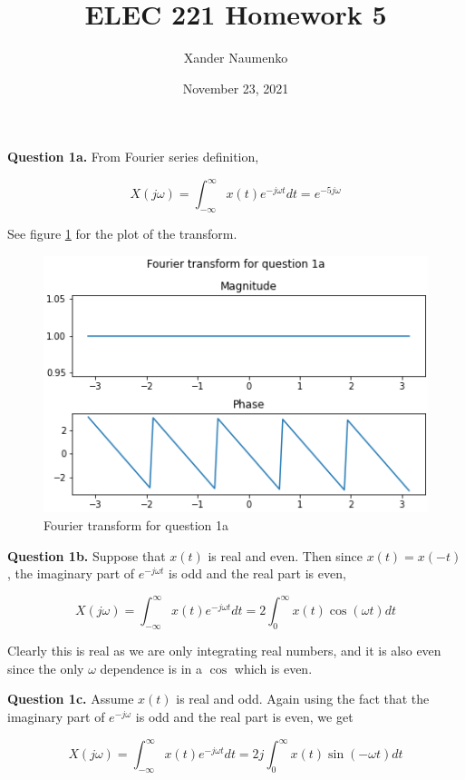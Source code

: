 \documentclass[letterpaper, reqno,11pt]{article}
\begin{document}
\title{ELEC 221 Homework 5}
\date{November 23, 2021}
\author{Xander Naumenko}
\maketitle

{\noindent\bf Question 1a.} From Fourier series definition, 

\[
    X(j\omega)=\int_{-\infty}^\infty x(t) e^{-j\omega t}dt=e^{-5j\omega}
\]

See figure \ref{fig:q1a} for the plot of the transform. 

\begin{figure}[htbp]
\centering
\includegraphics[width=\textwidth]{q1a.png}
\caption{Fourier transform for question 1a}
\label{fig:q1a}
\end{figure}

{\noindent\bf Question 1b.} Suppose that $x(t)$ is real and even. Then since $x(t)=x(-t)$, the imaginary part of $e^{-j\omega t}$ is odd and the real part is even, 

\[
    X(j\omega) = \int_{-\infty}^\infty x(t)e^{-j\omega t}dt=2\int_0^{\infty} x(t)\cos(\omega t)dt
\]

Clearly this is real as we are only integrating real numbers, and it is also even since the only $\omega$ dependence is in a $\cos$ which is even. 

{\noindent\bf Question 1c.} Assume $x(t)$ is real and odd. Again using the fact that the imaginary part of $e^{-j\omega}$ is odd and the real part is even, we get 

\[
    X(j\omega) = \int_{-\infty}^\infty x(t)e^{-j\omega t}dt=2j\int_0^\infty x(t)\sin(-\omega t)dt
\]
\end{document}

